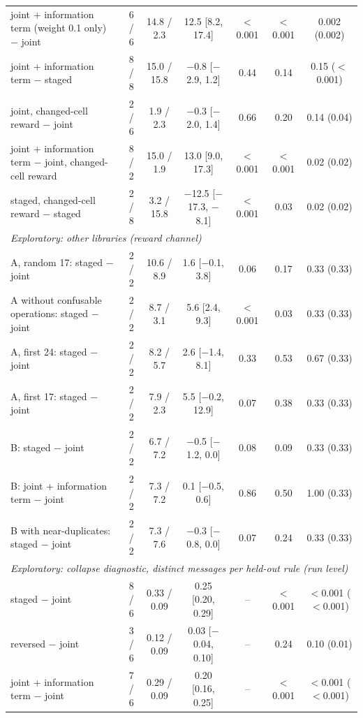 \begin{tabular}{lcccccc}
\quad joint + information term (weight 0.1 only) $-$ joint & 6 / 6 & 14.8 / 2.3 & 12.5 [8.2, 17.4] & $<$0.001 & $<$0.001 & 0.002 (0.002) \\
\quad joint + information term $-$ staged & 8 / 8 & 15.0 / 15.8 & $-$0.8 [$-$2.9, 1.2] & 0.44 & 0.14 & 0.15 ($<$0.001) \\
\quad joint, changed-cell reward $-$ joint & 2 / 6 & 1.9 / 2.3 & $-$0.3 [$-$2.0, 1.4] & 0.66 & 0.20 & 0.14 (0.04) \\
\quad joint + information term $-$ joint, changed-cell reward & 8 / 2 & 15.0 / 1.9 & 13.0 [9.0, 17.3] & $<$0.001 & $<$0.001 & 0.02 (0.02) \\
\quad staged, changed-cell reward $-$ staged & 2 / 8 & 3.2 / 15.8 & $-$12.5 [$-$17.3, $-$8.1] & $<$0.001 & 0.03 & 0.02 (0.02) \\
\multicolumn{7}{l}{\emph{Exploratory: other libraries (reward channel)}} \\
\quad A, random 17: staged $-$ joint & 2 / 2 & 10.6 / 8.9 & 1.6 [$-$0.1, 3.8] & 0.06 & 0.17 & 0.33 (0.33) \\
\quad A without confusable operations: staged $-$ joint & 2 / 2 & 8.7 / 3.1 & 5.6 [2.4, 9.3] & $<$0.001 & 0.03 & 0.33 (0.33) \\
\quad A, first 24: staged $-$ joint & 2 / 2 & 8.2 / 5.7 & 2.6 [$-$1.4, 8.1] & 0.33 & 0.53 & 0.67 (0.33) \\
\quad A, first 17: staged $-$ joint & 2 / 2 & 7.9 / 2.3 & 5.5 [$-$0.2, 12.9] & 0.07 & 0.38 & 0.33 (0.33) \\
\quad B: staged $-$ joint & 2 / 2 & 6.7 / 7.2 & $-$0.5 [$-$1.2, 0.0] & 0.08 & 0.09 & 0.33 (0.33) \\
\quad B: joint + information term $-$ joint & 2 / 2 & 7.3 / 7.2 & 0.1 [$-$0.5, 0.6] & 0.86 & 0.50 & 1.00 (0.33) \\
\quad B with near-duplicates: staged $-$ joint & 2 / 2 & 7.3 / 7.6 & $-$0.3 [$-$0.8, 0.0] & 0.07 & 0.24 & 0.33 (0.33) \\
\multicolumn{7}{l}{\emph{Exploratory: collapse diagnostic, distinct messages per held-out rule (run level)}} \\
\quad staged $-$ joint & 8 / 6 & 0.33 / 0.09 & 0.25 [0.20, 0.29] & -- & $<$0.001 & $<$0.001 ($<$0.001) \\
\quad reversed $-$ joint & 3 / 6 & 0.12 / 0.09 & 0.03 [$-$0.04, 0.10] & -- & 0.24 & 0.10 (0.01) \\
\quad joint + information term $-$ joint & 7 / 6 & 0.29 / 0.09 & 0.20 [0.16, 0.25] & -- & $<$0.001 & $<$0.001 ($<$0.001) \\

\end{tabular}
